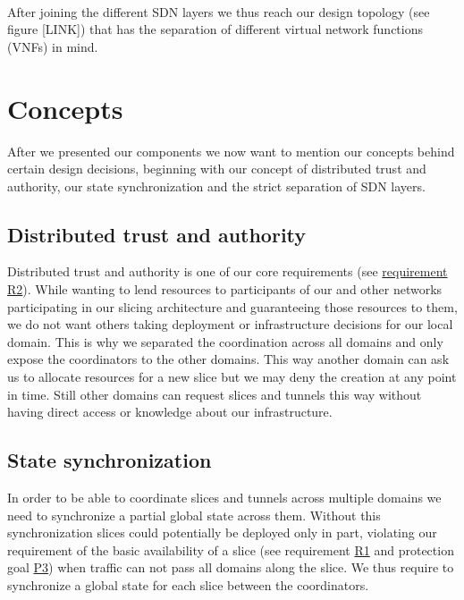 
\paragraph{} After joining the different SDN layers we thus reach our design topology (see figure [LINK]) that has the separation of different virtual network functions (VNFs) in mind.


\section{Concepts}
\label{design_concepts}
After we presented our components we now want to mention our concepts behind certain design decisions, beginning with our concept of distributed trust and authority, our state synchronization and the strict separation of SDN layers.

\subsection{Distributed trust and authority}
Distributed trust and authority is one of our core requirements (see \hyperref[R2]{requirement R2}). While wanting to lend resources to participants of our and other networks participating in our slicing architecture and guaranteeing those resources to them, we do not want others taking deployment or infrastructure decisions for our local domain. This is why we separated the coordination across all domains and only expose the coordinators to the other domains. This way another domain can ask us to allocate resources for a new slice but we may deny the creation at any point in time. Still other domains can request slices and tunnels this way without having direct access or knowledge about our infrastructure.

\subsection{State synchronization}
In order to be able to coordinate slices and tunnels across multiple domains we need to synchronize a partial global state across them. Without this synchronization slices could potentially be deployed only in part, violating our requirement of the basic availability of a slice (see requirement \hyperref[R1]{R1} and protection goal \hyperref[P3]{P3}) when traffic can not pass all domains along the slice. We thus require to synchronize a global state for each slice between the coordinators.

